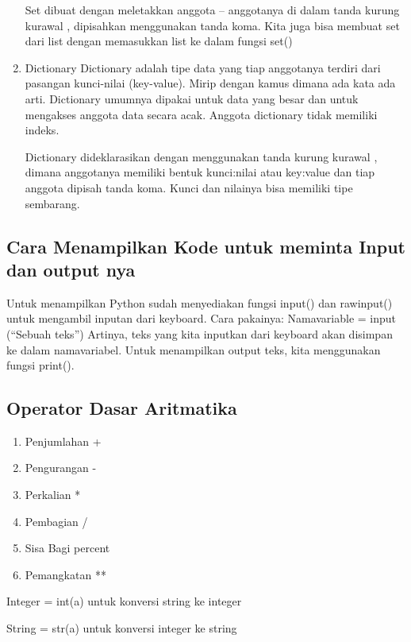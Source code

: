 \begin{enumerate}
Set dibuat dengan meletakkan anggota – anggotanya di dalam tanda kurung kurawal { }, dipisahkan menggunakan tanda koma. Kita juga bisa membuat set dari list dengan memasukkan list ke dalam fungsi set()

\item Dictionary
Dictionary adalah tipe data yang tiap anggotanya terdiri dari pasangan kunci-nilai (key-value). Mirip dengan kamus dimana ada kata ada arti. Dictionary umumnya dipakai untuk data yang besar dan untuk mengakses anggota data secara acak. Anggota dictionary tidak memiliki indeks.

Dictionary dideklarasikan dengan menggunakan tanda kurung kurawal { }, dimana anggotanya memiliki bentuk kunci:nilai atau key:value dan tiap anggota dipisah tanda koma. Kunci dan nilainya bisa memiliki tipe sembarang.
\end{enumerate}

\subsection{Cara Menampilkan Kode untuk meminta Input dan output nya}

Untuk menampilkan Python sudah menyediakan fungsi input() dan rawinput() untuk mengambil inputan dari keyboard.
Cara pakainya: 
Namavariable = input (“Sebuah teks”)
Artinya, teks yang kita inputkan dari keyboard akan disimpan ke dalam namavariabel.
Untuk menampilkan output teks, kita menggunakan fungsi print().

\subsection{Operator Dasar Aritmatika}

\begin{enumerate}
\item Penjumlahan	+
\item Pengurangan	-
\item Perkalian	*
\item Pembagian	/
\item Sisa Bagi	percent
\item Pemangkatan	**
\end{enumerate}

Integer = int(a) untuk konversi string ke integer

String = str(a) untuk konversi integer ke string

